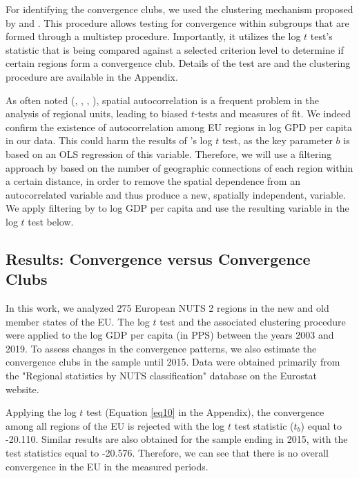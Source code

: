 \documentclass[11pt]{article}
\begin{document}
For identifying the convergence clubs, we used the clustering mechanism proposed by \citet{phillips2009economic} and \citet{bartkowska2012regional}. This procedure allows testing for convergence within subgroups that are formed through a multistep procedure. Importantly, it utilizes the log $t$ test's statistic that is being compared against a selected criterion level to determine if certain regions form a convergence club. Details of the test are and the clustering procedure are available in the Appendix.

As often noted (\citet{dall2008regional}, \citet{magrini2004regional}, \citet{anselin1991properties}, \citet{anselin2001spatial}), spatial autocorrelation is a frequent problem in the analysis of regional units, leading to biased $t$-tests and measures of fit. We indeed confirm the existence of autocorrelation among EU regions in log GPD per capita in our data. This could harm the results of \citeauthor{phillips2007transition}'s log $t$ test, as the key parameter $b$ is based on an OLS regression of this variable. Therefore, we will use a filtering approach by \cite{getis2002comparative} based on the number of geographic connections of each region within a certain distance, in order  to remove the spatial dependence from an autocorrelated variable and thus produce a new, spatially independent, variable. We apply filtering by \cite{getis2002comparative} to log GDP per capita and use the resulting variable in the log $t$ test below.



\subsection{Results: Convergence versus Convergence Clubs}
In this work, we analyzed 275 European NUTS 2 regions in the new and old member states of the EU. The log $t$ test and the associated clustering procedure were applied to the log GDP per capita (in PPS) between the years 2003 and 2019. To assess changes in the convergence patterns, we also estimate the convergence clubs in the sample until 2015. Data were obtained primarily from the "Regional statistics by NUTS classification" database on the Eurostat website.


Applying the log $t$ test (Equation \ref{eq10} in the Appendix), the convergence among all regions of the EU is rejected with the log $t$ test statistic ($t_b$) equal to -20.110. Similar results are also obtained for the sample ending in 2015, with the test statistics equal to -20.576. Therefore, we can see that there is no overall convergence in the EU in the measured periods.
\end{document}
